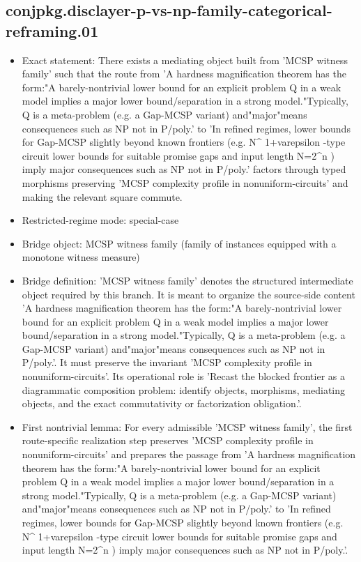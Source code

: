 \documentclass[11pt]{article}
\begin{document}
\subsection*{conjpkg.disclayer-p-vs-np-family-categorical-reframing.01}
\begin{itemize}
\item Exact statement: There exists a mediating object built from 'MCSP witness family' such that the route from 'A hardness magnification theorem has the form:"A barely-nontrivial lower bound for an explicit problem Q in a weak model implies a major lower bound/separation in a strong model."Typically, Q is a meta-problem (e.g. a Gap-MCSP variant) and"major"means consequences such as NP not in P/poly.' to 'In refined regimes, lower bounds for Gap-MCSP slightly beyond known frontiers (e.g. N\textasciicircum{} 1+varepsilon -type circuit lower bounds for suitable promise gaps and input length N=2\textasciicircum{}n ) imply major consequences such as NP not in P/poly.' factors through typed morphisms preserving 'MCSP complexity profile in nonuniform-circuits' and making the relevant square commute.
\item Restricted-regime mode: special-case
\item Bridge object: MCSP witness family (family of instances equipped with a monotone witness measure)
\item Bridge definition: 'MCSP witness family' denotes the structured intermediate object required by this branch. It is meant to organize the source-side content 'A hardness magnification theorem has the form:"A barely-nontrivial lower bound for an explicit problem Q in a weak model implies a major lower bound/separation in a strong model."Typically, Q is a meta-problem (e.g. a Gap-MCSP variant) and"major"means consequences such as NP not in P/poly.'. It must preserve the invariant 'MCSP complexity profile in nonuniform-circuits'. Its operational role is 'Recast the blocked frontier as a diagrammatic composition problem: identify objects, morphisms, mediating objects, and the exact commutativity or factorization obligation.'.
\item First nontrivial lemma: For every admissible 'MCSP witness family', the first route-specific realization step preserves 'MCSP complexity profile in nonuniform-circuits' and prepares the passage from 'A hardness magnification theorem has the form:"A barely-nontrivial lower bound for an explicit problem Q in a weak model implies a major lower bound/separation in a strong model."Typically, Q is a meta-problem (e.g. a Gap-MCSP variant) and"major"means consequences such as NP not in P/poly.' to 'In refined regimes, lower bounds for Gap-MCSP slightly beyond known frontiers (e.g. N\textasciicircum{} 1+varepsilon -type circuit lower bounds for suitable promise gaps and input length N=2\textasciicircum{}n ) imply major consequences such as NP not in P/poly.'.

\end{itemize}
\end{document}
